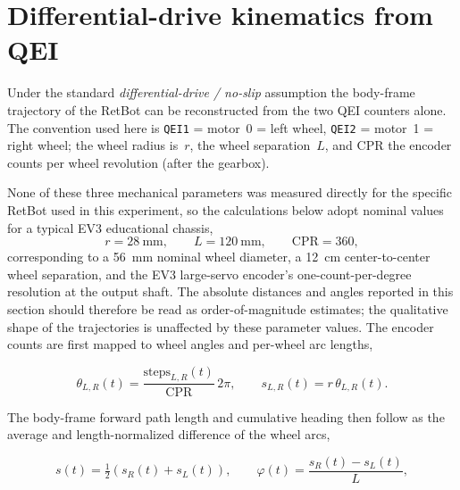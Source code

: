 \documentclass[12pt, oneside, a4paper]{scrreprt}
\begin{document}
        \section{Differential-drive kinematics from QEI}\label{sec:diffdrive}

            Under the standard \emph{differential-drive / no-slip} assumption the body-frame trajectory of the RetBot can be reconstructed from the two QEI counters alone. The convention used here is \texttt{QEI1} = motor~0 = left wheel, \texttt{QEI2} = motor~1 = right wheel; the wheel radius is~$r$, the wheel separation~$L$, and \(\mathrm{CPR}\) the encoder counts per wheel revolution (after the gearbox).

            None of these three mechanical parameters was measured directly for the specific RetBot used in this experiment, so the calculations below adopt nominal values for a typical EV3 educational chassis,
            \begin{equation*}
                r = \SI{28}{\milli\meter},
                \qquad
                L = \SI{120}{\milli\meter},
                \qquad
                \mathrm{CPR} = 360,
            \end{equation*}
            corresponding to a \SI{56}{\milli\meter} nominal wheel diameter, a \SI{12}{\centi\meter} center-to-center wheel separation, and the EV3 large-servo encoder's one-count-per-degree resolution at the output shaft. The absolute distances and angles reported in this section should therefore be read as order-of-magnitude estimates; the qualitative shape of the trajectories is unaffected by these parameter values. The encoder counts are first mapped to wheel angles and per-wheel arc lengths,

            \begin{equation}
                \theta_{L,R}(t) = \frac{\mathrm{steps}_{L,R}(t)}{\mathrm{CPR}}\,2\pi,
                \qquad
                s_{L,R}(t) = r\,\theta_{L,R}(t).
                \label{eq:diffdrive-wheel}
            \end{equation}

            The body-frame forward path length and cumulative heading then follow as the average and length-normalized difference of the wheel arcs,

            \begin{equation}
                s(t) = \tfrac{1}{2}\!\left(s_R(t) + s_L(t)\right),
                \qquad
                \varphi(t) = \frac{s_R(t) - s_L(t)}{L},
                \label{eq:diffdrive-body}
            \end{equation}
\end{document}
